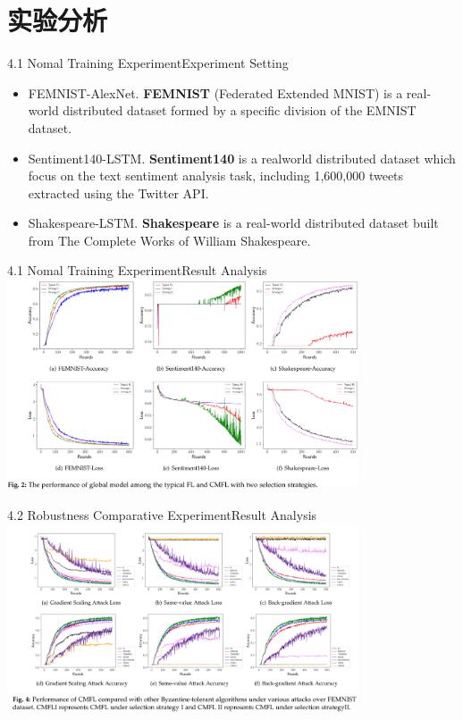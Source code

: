 \documentclass{sintefbeamer}
\theoremstyle{definition}
\begin{document}
\section{实验分析}

\begin{frame}{4.1 Nomal Training Experiment}{Experiment Setting}
	\begin{itemize}
\item[1)] FEMNIST-AlexNet. \textbf{FEMNIST} (Federated Extended MNIST) is a real-world distributed dataset formed by a specific division of the EMNIST dataset. 
\item[2)] Sentiment140-LSTM. \textbf{Sentiment140} is a realworld distributed dataset which focus on the text sentiment analysis task, including 1,600,000 tweets extracted using the Twitter API. 
\item[3)] Shakespeare-LSTM. \textbf{Shakespeare} is a real-world distributed dataset built from The Complete Works of William Shakespeare. 
\end{itemize}
\end{frame}

\begin{frame}{4.1 Nomal Training Experiment}{Result Analysis}
	\includegraphics[width=0.78\textwidth]{images/exp_fig2}
\end{frame}

%	



\begin{frame}{4.2 Robustness Comparative Experiment}{Result Analysis}
	\includegraphics[width=0.78\textwidth]{images/exp_fig4}
\end{frame}
\end{document}

